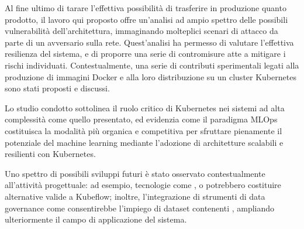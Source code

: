 Al fine ultimo di tarare l'effettiva possibilità di trasferire in produzione quanto prodotto, il lavoro qui proposto offre un'analisi ad ampio spettro delle possibili vulnerabilità dell'architettura, immaginando molteplici scenari di attacco da parte di un avversario sulla rete. Quest'analisi ha permesso di valutare l'effettiva resilienza del sistema, e di proporre una serie di contromisure atte a mitigare i rischi individuati. Contestualmente, una serie di contributi sperimentali legati alla produzione di immagini Docker e alla loro distribuzione su un cluster Kubernetes sono stati proposti e discussi.

Lo studio condotto sottolinea il ruolo critico di Kubernetes nei sistemi ad alta complessità come quello presentato, ed evidenzia come il paradigma MLOps costituisca la modalità più organica e competitiva per sfruttare pienamente il potenziale del machine learning mediante l'adozione di architetture scalabili e resilienti con Kubernetes.

Uno spettro di possibili sviluppi futuri è stato osservato contestualmente all'attività progettuale: ad esempio, tecnologie come ,  o  potrebbero costituire alternative valide a Kubeflow; inoltre, l'integrazione di strumenti di data governance come  consentirebbe l'impiego di dataset contenenti , ampliando ulteriormente il campo di applicazione del sistema.